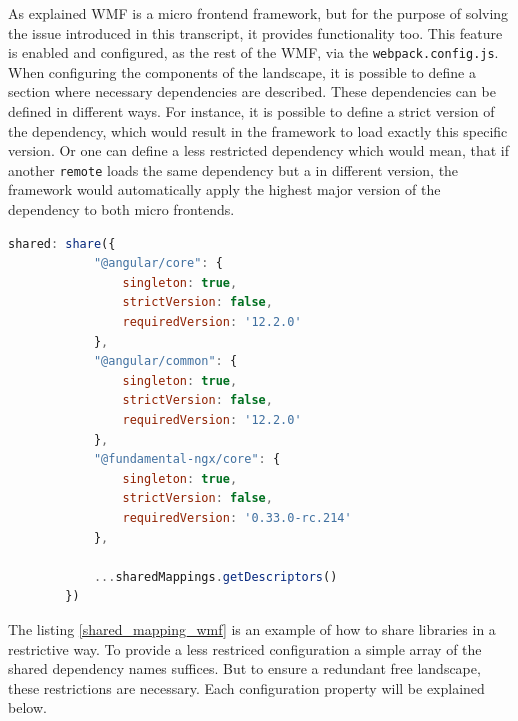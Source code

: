 As explained WMF is a micro frontend framework, but for the purpose of solving the issue introduced in this transcript, it provides functionality too.
This feature is enabled and configured, as the rest of the WMF, via the \texttt{webpack.config.js}. When configuring the components of the landscape, it is possible to define a section where necessary dependencies are described. These dependencies can be defined in different ways. For instance, it is possible to define a strict version of the dependency, which would result in the framework to load exactly this specific version. Or one can define a less restricted dependency which would mean, that if another \texttt{remote} loads the same dependency but a in different version, the framework would automatically apply the highest major version of the dependency to both micro frontends.
\newpage
\begin{lstlisting}[language=JavaScript, caption=Example of sharing dependencies configured in the \texttt{webpack.config.js}, label=shared_mapping_wmf]
	  shared: share({
			"@angular/core": { 
				singleton: true, 
				strictVersion: false, 
				requiredVersion: '12.2.0' 
			},
			"@angular/common": { 
				singleton: true, 
				strictVersion: false, 
				requiredVersion: '12.2.0' 
			},
			"@fundamental-ngx/core": { 
				singleton: true, 
				strictVersion: false, 
				requiredVersion: '0.33.0-rc.214' 
			},
			
			...sharedMappings.getDescriptors()
		})
\end{lstlisting}

The listing \ref{shared_mapping_wmf} is an example of how to share libraries in a restrictive way. To provide a less restriced configuration a simple array of the shared dependency names suffices. But to ensure a redundant free landscape, these restrictions are necessary. Each configuration property will be explained below.

